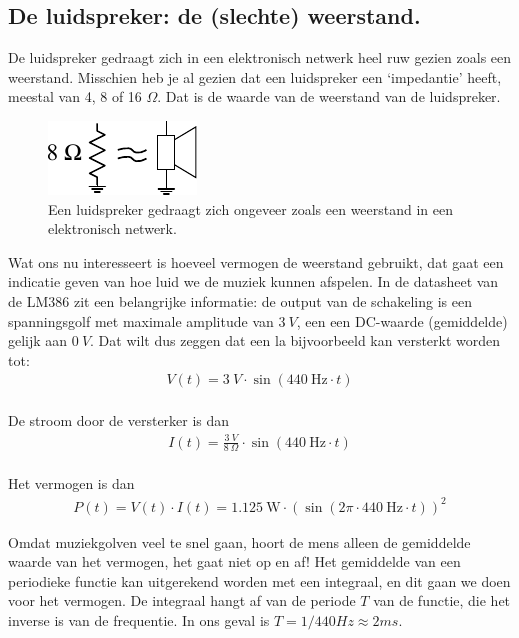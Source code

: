 \documentclass{article}
\begin{document}
		\subsection{De luidspreker: de (slechte) weerstand.} 
		
			De luidspreker gedraagt zich in een elektronisch netwerk heel ruw gezien zoals een weerstand. Misschien heb je al gezien dat een luidspreker een `impedantie' heeft, meestal van 4, 8 of 16 $\Omega$. Dat is de waarde van de weerstand van de luidspreker.

			\begin{figure}[htbp]
				\centering
				\includegraphics[scale=1.5]{luidspreker}
				\caption{Een luidspreker gedraagt zich ongeveer zoals een weerstand in een elektronisch netwerk.}
				\label{fig:luidspreker}
			\end{figure}

			Wat ons nu interesseert is hoeveel vermogen de weerstand gebruikt, dat gaat een indicatie geven van hoe luid we de muziek kunnen afspelen.
			In de datasheet van de LM386 zit  een belangrijke informatie: de output van de schakeling is een spanningsgolf met maximale amplitude van $3~V$, een een DC-waarde (gemiddelde) gelijk aan $0~V$.
			Dat wilt dus zeggen dat een la bijvoorbeeld kan versterkt worden tot:
			\begin{align}
				V(t) = 3~V \cdot \sin (440~\text{Hz} \cdot t) \\
			\end{align}

			De stroom door de versterker is dan 
				\begin{align}
				I(t) = \frac{3~V}{8~\Omega} \cdot \sin (440~\text{Hz} \cdot t) \\
			\end{align}

			Het vermogen is dan
			\begin{align}
				P(t) = V(t) \cdot I(t) = 1.125~\text{W} \cdot \left( \sin \left(2\pi \cdot 440~\text{Hz} \cdot t\right) \right)^2
			\end{align}

			Omdat muziekgolven veel te snel gaan, hoort de mens alleen de gemiddelde waarde van het vermogen, het gaat niet op en af! 
			Het gemiddelde van een periodieke functie kan uitgerekend worden met een integraal, en dit gaan we doen voor het vermogen. 
			De integraal hangt af van de periode $T$ van de functie, die het inverse is van de frequentie. In ons geval is $T = 1/440Hz \approx 2 ms$.
\end{document}
